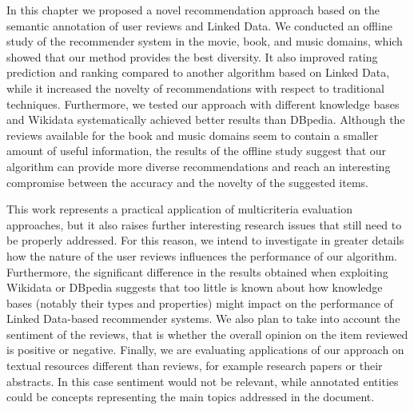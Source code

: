 In this chapter we proposed a novel recommendation approach based on the semantic annotation of user reviews and Linked Data. We conducted an offline study of the recommender system in the movie, book, and music domains, which showed that our method provides the best diversity. It also improved rating prediction and ranking compared to another algorithm based on Linked Data, while it increased the novelty of recommendations with respect to traditional techniques. Furthermore, we tested our approach with different knowledge bases and Wikidata systematically achieved better results than DBpedia. Although the reviews available for the book and music domains seem to contain a smaller amount of useful information, the results of the offline study suggest that our algorithm can provide more diverse recommendations and reach an interesting compromise between the accuracy and the novelty of the suggested items.

This work represents a practical application of multicriteria evaluation approaches, but it also raises further interesting research issues that still need to be properly addressed. For this reason, we intend to investigate in greater details how the nature of the user reviews influences the performance of our algorithm. Furthermore, the significant difference in the results obtained when exploiting Wikidata or DBpedia suggests that too little is known about how knowledge bases (notably their types and properties) might impact on the performance of Linked Data-based recommender systems. We also plan to take into account the sentiment of the reviews, that is whether the overall opinion on the item reviewed is positive or negative. Finally, we are evaluating applications of our approach on textual resources different than reviews, for example research papers or their abstracts. In this case sentiment would not be relevant, while annotated entities could be concepts representing the main topics addressed in the document.
